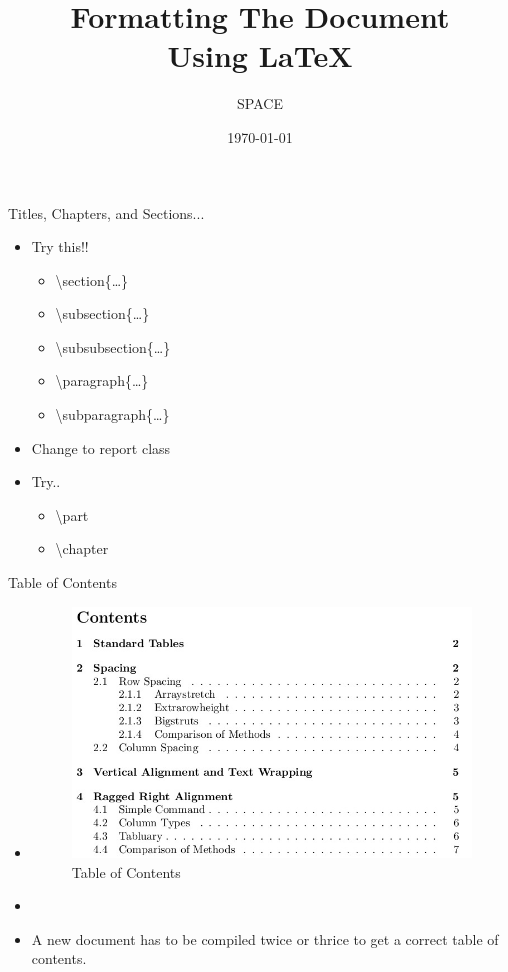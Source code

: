 \documentclass{beamer}
\title{Formatting The Document \\ Using \LaTeX}
\author{SPACE}
\date{\today}
\begin{document}
\maketitle

\begin{frame}{Titles, Chapters, and Sections...}
\begin{itemize}
\pause \item[]\begin{block}{Try this!!}
\begin{itemize}
\pause \item \textbackslash section\{\ldots\}
\pause \item \textbackslash subsection\{\ldots\}
\pause \item \textbackslash subsubsection\{\ldots\}
\pause \item \textbackslash paragraph\{\ldots\}
\pause \item \textbackslash subparagraph\{\ldots\}
\end{itemize}
\end{block}
\pause \item Change to report class
\pause \item[] \begin{block}{Try..}
\begin{itemize}
\pause \item \textbackslash part
\pause \item \textbackslash chapter
\end{itemize}
\end{block}
\end{itemize}
\end{frame}

\begin{frame}{Table of Contents}
\begin{itemize}
\pause \item[] \begin{figure}
\centering
\includegraphics[width=0.7\linewidth,angle=0]{table}
\caption{Table of Contents}
\label{fig:golden}
\end{figure}
\pause\item{}
\item[] A new document has to be compiled twice or thrice to get a correct table of contents.
\end{itemize}
\end{frame}
\end{document}
